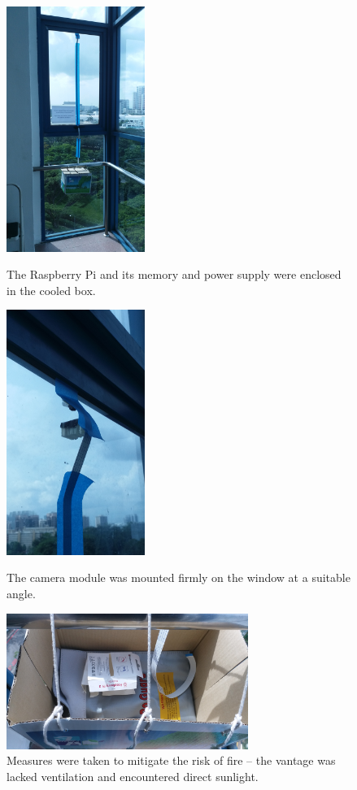 \documentclass[a4paper, 11pt]{article} %
\begin{document}
	\begin{figure}[H]
		\centering
		\includegraphics[width=0.4\textwidth, angle=-90]{figures/rpi_camera_1.jpg}
		\caption{The Raspberry Pi and its memory and power supply were enclosed in the cooled box.}
		\includegraphics[width=0.4\textwidth, angle=-90]{figures/rpi_camera_2.jpg}
		\caption{The camera module was mounted firmly on the window at a suitable angle.}
		\includegraphics[width=0.7\textwidth]{figures/rpi_camera_3.jpg}
		\caption{Measures were taken to mitigate the risk of fire -- the vantage was lacked ventilation and 
		encountered direct sunlight.}
	\end{figure}
\end{document}
